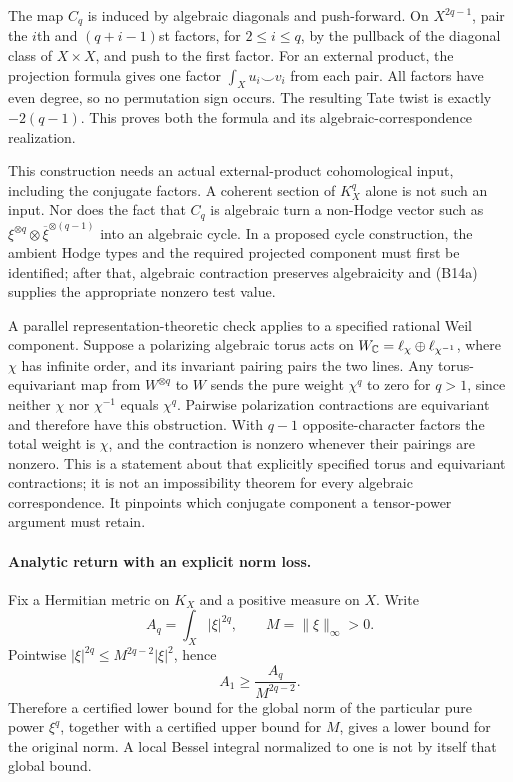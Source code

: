 \documentclass[11pt]{article}
\theoremstyle{definition}\newtheorem{definition}[theorem]{Definition}\newtheorem{remark}[theorem]{Remark}
\begin{document}
The map $C_q$ is induced by algebraic diagonals and push-forward. On $X^{2q-1}$, pair the $i$th and $(q+i-1)$st factors, for $2\leq i\leq q$, by the pullback of the diagonal class of $X\times X$, and push to the first factor. For an external product, the projection formula gives one factor $\int_Xu_i\smile v_i$ from each pair. All factors have even degree, so no permutation sign occurs. The resulting Tate twist is exactly $-2(q-1)$. This proves both the formula and its algebraic-correspondence realization.

This construction needs an actual external-product cohomological input, including the conjugate factors. A coherent section of $K_X^q$ alone is not such an input. Nor does the fact that $C_q$ is algebraic turn a non-Hodge vector such as $\xi^{\otimes q}\otimes\overline\xi^{\otimes(q-1)}$ into an algebraic cycle. In a proposed cycle construction, the ambient Hodge types and the required projected component must first be identified; after that, algebraic contraction preserves algebraicity and (B14a) supplies the appropriate nonzero test value.

A parallel representation-theoretic check applies to a specified rational Weil component. Suppose a polarizing algebraic torus acts on
$W_\mathbb C=\ell_\chi\oplus\ell_{\chi^{-1}}$, where $\chi$ has infinite order, and its invariant pairing pairs the two lines. Any torus-equivariant map from $W^{\otimes q}$ to $W$ sends the pure weight $\chi^q$ to zero for $q>1$, since neither $\chi$ nor $\chi^{-1}$ equals $\chi^q$. Pairwise polarization contractions are equivariant and therefore have this obstruction. With $q-1$ opposite-character factors the total weight is $\chi$, and the contraction is nonzero whenever their pairings are nonzero. This is a statement about that explicitly specified torus and equivariant contractions; it is not an impossibility theorem for every algebraic correspondence. It pinpoints which conjugate component a tensor-power argument must retain.

\paragraph{Analytic return with an explicit norm loss.}
Fix a Hermitian metric on $K_X$ and a positive measure on $X$. Write
\[
 A_q=\int_X|\xi|^{2q},\qquad M=\|\xi\|_\infty>0.
\]
Pointwise $|\xi|^{2q}\leq M^{2q-2}|\xi|^2$, hence
\[
 A_1\geq \frac{A_q}{M^{2q-2}}.
 \tag{B14b}
\]
Therefore a certified lower bound for the global norm of the particular pure power $\xi^q$, together with a certified upper bound for $M$, gives a lower bound for the original norm. A local Bessel integral normalized to one is not by itself that global bound.
\end{document}
